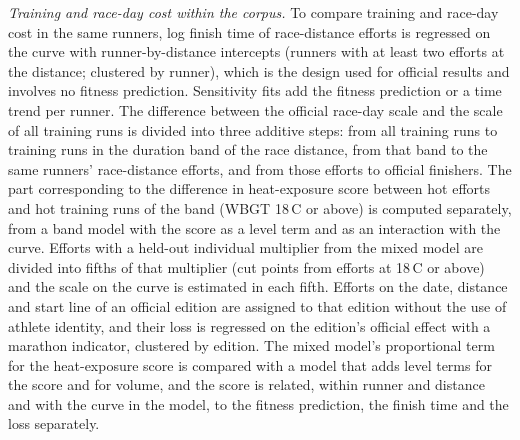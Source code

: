 \documentclass[11pt]{article}
\renewcommand{\_}{\textunderscore\allowbreak}
\begin{document}
\emph{Training and race-day cost within the corpus.} To compare training and race-day cost in the same runners, log finish time of race-distance efforts is regressed on the curve with runner-by-distance intercepts (runners with at least two efforts at the distance; clustered by runner), which is the design used for official results and involves no fitness prediction. Sensitivity fits add the fitness prediction or a time trend per runner. The difference between the official race-day scale and the scale of all training runs is divided into three additive steps: from all training runs to training runs in the duration band of the race distance, from that band to the same runners' race-distance efforts, and from those efforts to official finishers. The part corresponding to the difference in heat-exposure score between hot efforts and hot training runs of the band (WBGT 18\,\textdegree C or above) is computed separately, from a band model with the score as a level term and as an interaction with the curve. Efforts with a held-out individual multiplier from the mixed model are divided into fifths of that multiplier (cut points from efforts at 18\,\textdegree C or above) and the scale on the curve is estimated in each fifth. Efforts on the date, distance and start line of an official edition are assigned to that edition without the use of athlete identity, and their loss is regressed on the edition's official effect with a marathon indicator, clustered by edition. The mixed model's proportional term for the heat-exposure score is compared with a model that adds level terms for the score and for volume, and the score is related, within runner and distance and with the curve in the model, to the fitness prediction, the finish time and the loss separately.
\end{document}
